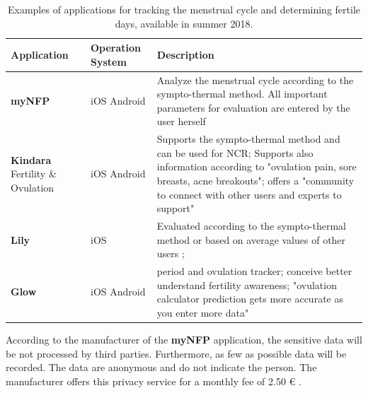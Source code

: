 \begin{table}[t]
  \caption{Examples of applications for tracking the menstrual cycle and determining fertile days, available in summer 2018.}
  \label{tab:typ_of_app_for_tracking_cycle}
  \scriptsize
  \begin{center}
    \begin{tabular}{|p{2cm}|p{3cm}|p{12cm}|}
		\hline
		Application & Operation System  & Description \\
		\hline
		\hline
		
		\textbf{myNFP} &  iOS \newline Android &  Analyze the menstrual cycle according to the sympto-thermal method. All important parameters for evaluation are entered by the user herself \cite{myNFP}
		\\
		\hline
		\textbf{Kindara} Fertility \& Ovulation  & iOS \newline Android & Supports the sympto-thermal method and can be used for \acs{NCR}; Supports also information according to "ovulation pain, sore breasts, acne breakouts"; offers a "community to connect with other users and experts to support" \cite{kindara}\\
		\hline
		\textbf{Lily} & iOS & Evaluated according to the sympto-thermal method or based on average values of other users \cite{lily};
		 \\
		\hline
		\textbf{Glow} & iOS \newline Android & period and ovulation tracker; conceive better understand fertility awareness; "ovulation calculator prediction gets more accurate as you enter more data" \cite{glow}\\
		\hline
	\end{tabular}
  \end{center}
\end{table}
According to the manufacturer of the \textbf{myNFP} application, the sensitive data will be not processed by third parties. Furthermore, as few as possible data will be recorded. The data are anonymous and do not indicate the person. The manufacturer offers this privacy service for a monthly fee of 2.50 \euro{} \cite{myNFP}.

